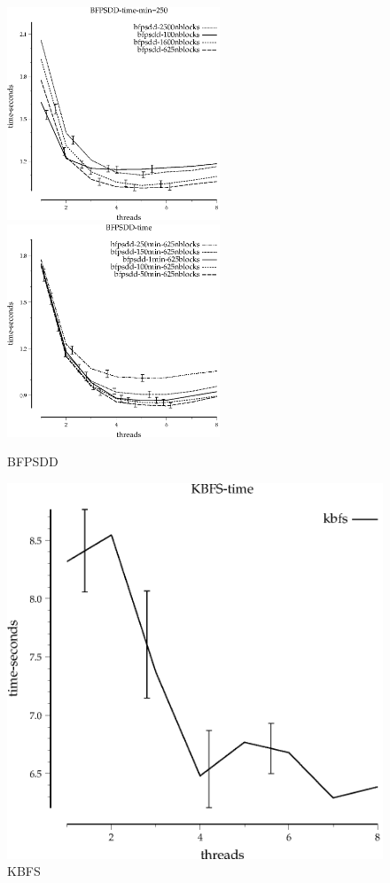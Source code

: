 \documentclass{article}
\begin{document}
\begin{figure}
\begin{center}
\includegraphics[width=2.5in]{BFPSDD-time-min=250}
\includegraphics[width=2.5in]{BFPSDD-time}
\end{center}
\caption{BFPSDD}
\end{figure}


\begin{figure}
\begin{center}
\includegraphics{KBFS-time}
\end{center}
\caption{KBFS}
\end{figure}
\end{document}
